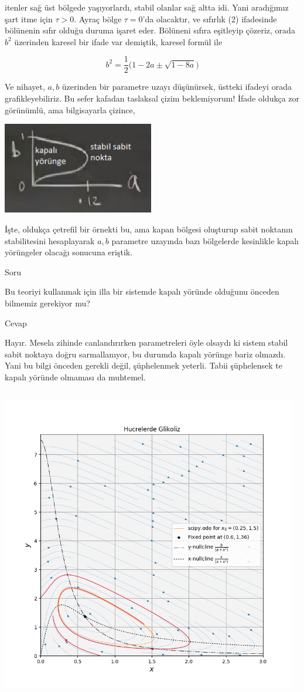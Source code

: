\documentclass[12pt,fleqn]{article}\usepackage{../../common}
\begin{document}
itenler sağ üst bölgede yaşıyorlardı, stabil olanlar sağ altta idi. Yani
aradığımız şart itme için $\tau > 0$. Ayraç bölge $\tau=0$'da olacaktır, ve
sıfırlık (2) ifadesinde bölünenin sıfır olduğu duruma işaret eder. Bölüneni
sıfıra eşitleyip çözeriz, orada $b^2$ üzerinden karesel bir ifade var demiştik,
karesel formül ile

$$ b^2 = \frac{1}{2} \bigg( 1 - 2a \pm \sqrt{1-8a} \bigg) $$

Ve nihayet, $a,b$ üzerinden bir parametre uzayı düşünürsek, üstteki ifadeyi
orada grafikleyebiliriz. Bu sefer kafadan taslaksal çizim beklemiyorum! İfade
oldukça zor görünümlü, ama bilgisayarla çizince,


\includegraphics[height=4cm]{09_18.png}

İşte, oldukça çetrefil bir örnekti bu, ama kapan bölgesi oluşturup sabit
noktanın stabilitesini hesaplayarak $a,b$ parametre uzayında bazı bölgelerde
kesinlikle kapalı yörüngeler olacağı sonucuna eriştik. 

Soru

Bu teoriyi kullanmak için illa bir sistemde kapalı yöründe olduğunu önceden
bilmemiz gerekiyor mu?

Cevap

Hayır. Mesela zihinde canlandırırken parametreleri öyle olsaydı ki sistem stabil
sabit noktaya doğru sarmallanıyor, bu durumda kapalı yörünge bariz olmazdı. Yani
bu bilgi önceden gerekli değil, şüphelenmek yeterli. Tabii şüphelensek te kapalı
yöründe olmaması da muhtemel. 

\inputminted[fontsize=\footnotesize]{python}{ex.7.3.2.py}

\includegraphics[width=35em]{09_19.png}
\end{document}
